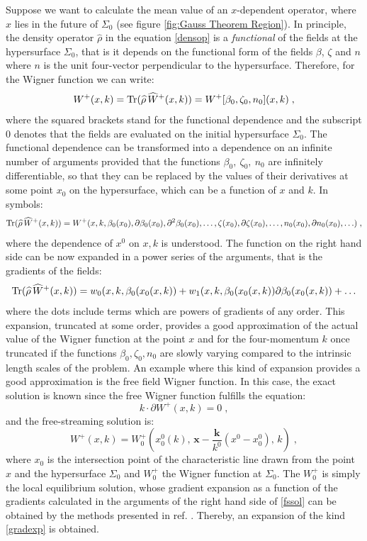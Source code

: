 \documentclass[prd,superscriptaddress,nofootinbib,notitlepage]{revtex4-1}
\def\wrho{{\widehat{\rho}}}
\def\wW{\widehat W}
\newcommand{\Tr}{{\rm Tr}}
\newcommand{\kb}{{\mathbf{k}}}
\newcommand{\x}{{\mathbf{x}}}
\newcommand{\be}{\begin{equation}}
\newcommand{\ee}{\end{equation}}
\begin{document}
Suppose we want to calculate the mean value of an $x$-dependent operator, where $x$ lies in the future of $\Sigma_0$ (see figure 
\ref{fig:Gauss Theorem Region}). In principle, the density operator $\wrho$ in the equation \eqref{densop} is a {\em functional}
of the fields at the hypersurface $\Sigma_0$, that is it depends on the functional form of the fields $\beta$, $\zeta$ and $n$
where $n$ is the unit four-vector perpendicular to the hypersurface. Therefore, for the Wigner function we can write:
%
$$
  W^+(x,k) = \Tr (\wrho\,\wW^+(x,k)) = W^+[\beta_0,\zeta_0,n_0](x,k)\;,
$$
%
where the squared brackets stand for the functional dependence and the subscript $0$ denotes that the fields are evaluated on 
the initial hypersurface $\Sigma_0$. The functional dependence can be transformed into a dependence on an infinite number of 
arguments provided that the functions $\beta_0,\ \zeta_0,\ n_0$ are infinitely differentiable, so that they can be replaced by the 
values of their derivatives at some point $x_0$ on the hypersurface, which can be a function of $x$ and $k$. In symbols:
%
$$
 \Tr (\wrho\,\wW^+(x,k)) = W^+(x,k,\beta_0(x_0),\partial \beta_0(x_0),\partial^2 \beta_0(x_0),\ldots,\zeta(x_0),\partial \zeta(x_0),
 \ldots,n_0(x_0),\partial n_0(x_0),\ldots)\;,
$$
%
where the dependence of $x^0$ on $x,k$ is understood.
The function on the right hand side can be now expanded in a power series of the arguments, that is the gradients of the fields:
%
\be\label{gradexp}
 \Tr (\wrho\,\wW^+(x,k)) = w_0(x,k,\beta_0(x_0(x,k)) + w_1(x,k,\beta_0(x_0(x,k)) \partial\beta_0(x_0(x,k)) + \ldots
\ee
%
where the dots include terms which are powers of gradients of any order.
This expansion, truncated at some order, provides a good approximation of the actual value of the Wigner function 
at the point $x$ and for the four-momentum $k$ once truncated if the functions $\beta_0,\zeta_0,n_0$ are slowly varying 
compared to the intrinsic length scales of the problem. 
An example where this kind of expansion provides a good approximation is the free field Wigner function. In this case, the 
exact solution is known since the free Wigner function fulfills the equation:
%
$$
  k \cdot \partial W^+(x,k) = 0\;,
$$
%
and the free-streaming solution is:
%
\be\label{fssol}
 W^+\left(x,k\right) = W^+_0\left(x^0_0(k),\,\x-\frac{\kb}{k^0}\left(x^0-x^0_0\right),\,k\right)\;,
\ee
%
where $x_0$ is the intersection point of the characteristic line drawn from the point $x$ and the hypersurface $\Sigma_0$
and $W_0^+$ the Wigner function at $\Sigma_0$. The $W^+_0$ is simply the local equilibrium solution, whose gradient expansion 
as a function of the gradients calculated in the arguments of the right hand side of \eqref{fssol} can be obtained by the methods 
presented in ref. \cite{Sheng:2025cjk}. Thereby, an expansion of the kind \eqref{gradexp} is obtained.
\end{document}
